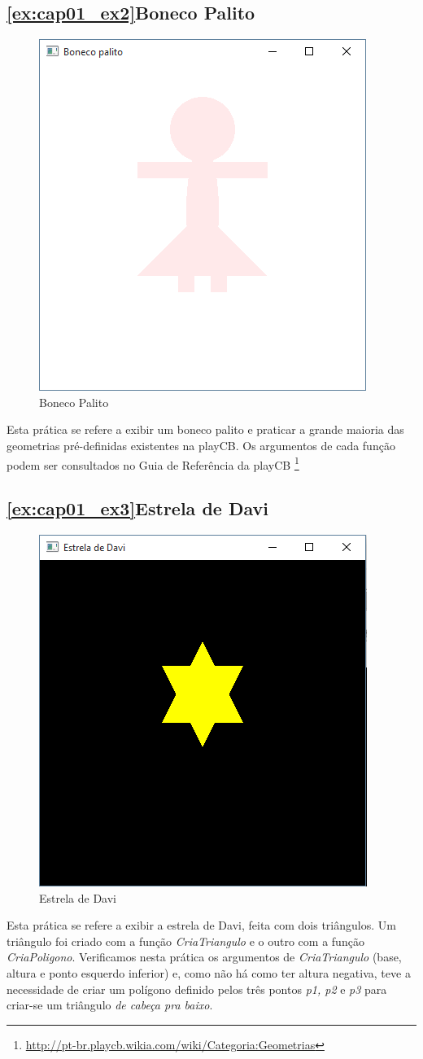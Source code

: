 \subsection{\ref{ex:cap01_ex2}Boneco Palito}
\begin{figure}[ht]
  \centerline{\includegraphics[width=.5\textwidth]{img/cap1_ex3.png}}
  \caption{Boneco Palito}
  \label{fig:cap01_ex2}
\end{figure}
Esta prática se refere a exibir um boneco palito e praticar a grande maioria das geometrias pré-definidas existentes na playCB. Os argumentos de cada função podem ser consultados no Guia de Referência da playCB \footnote{\url{http://pt-br.playcb.wikia.com/wiki/Categoria:Geometrias}}


\subsection{\ref{ex:cap01_ex3}Estrela de Davi}
\begin{figure}[ht]
  \centerline{\includegraphics[width=.5\textwidth]{img/cap1_ex2.png}}
  \caption{Estrela de Davi}
  \label{fig:cap01_ex3}
\end{figure}
Esta prática se refere a exibir a estrela de Davi, feita com dois triângulos. Um triângulo foi criado com a função \emph{CriaTriangulo} e o outro com a função \emph{CriaPoligono}. Verificamos nesta prática os argumentos de \emph{CriaTriangulo} (base, altura e ponto esquerdo inferior) e, como não há como ter altura negativa, teve a necessidade de criar um polígono definido pelos três pontos \emph{p1, p2} e \emph{p3} para criar-se um triângulo \emph{de cabeça pra baixo}.



